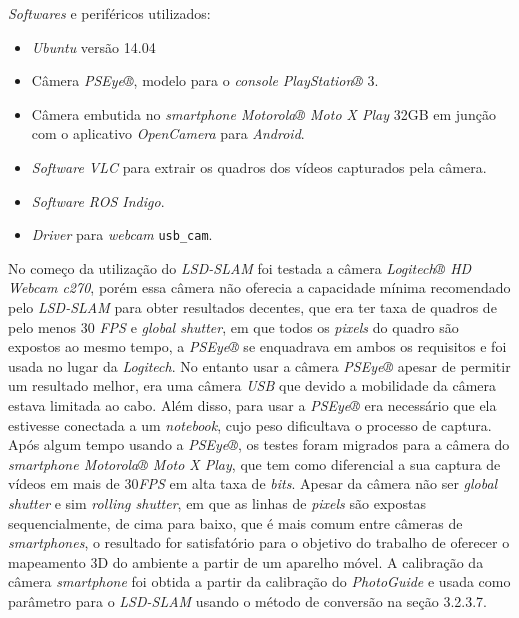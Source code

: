 \textit{Softwares} e periféricos utilizados:

\begin{itemize}
	\item{\textit{Ubuntu} versão 14.04\cite{Ubuntu}}
	\item{Câmera \textit{PSEye®}, modelo para o \textit{console} \textit{PlayStation®} 3.}
	\item{Câmera embutida no \textit{smartphone Motorola® Moto X Play} 32GB em junção com o aplicativo \textit{OpenCamera} para \textit{Android}.}
	\item{\textit{Software VLC} para extrair os quadros dos vídeos capturados pela câmera.}
	\item{\textit{Software ROS Indigo}.\cite{ROS-Tutorial}}
	\item{\textit{Driver} para \textit{webcam} \texttt{usb\_cam}.\cite{Setup-USBCAM}}
\end{itemize}

No começo da utilização do \textit{LSD-SLAM} foi testada a câmera \textit{Logitech® HD Webcam c270}, porém essa câmera não oferecia a capacidade mínima recomendado pelo \textit{LSD-SLAM} para obter resultados decentes, que era ter taxa de quadros de pelo menos 30 \textit{FPS} e \textit{global shutter}, em que todos os \textit{pixels} do quadro são expostos ao mesmo tempo, a \textit{PSEye®} se enquadrava em ambos os requisitos e foi usada no lugar da \textit{Logitech}. No entanto usar a câmera \textit{PSEye®} apesar de permitir um resultado melhor, era uma câmera \textit{USB} que devido a mobilidade da câmera estava limitada ao cabo. Além disso, para usar a \textit{PSEye®} era necessário que ela estivesse conectada a um \textit{notebook}, cujo peso dificultava o processo de captura. Após algum tempo usando a \textit{PSEye®}, os testes foram migrados para a câmera do \textit{smartphone Motorola® Moto X Play}, que tem como diferencial a sua captura de vídeos em mais de 30\textit{FPS} em alta taxa de \textit{bits}. Apesar da câmera não ser \textit{global shutter} e sim \textit{rolling shutter}, em que as linhas de \textit{pixels} são expostas sequencialmente, de cima para baixo, que é mais comum entre câmeras de \textit{smartphones}, o resultado for satisfatório para o objetivo do trabalho de oferecer o mapeamento 3D do ambiente a partir de um aparelho móvel. A calibração da câmera \textit{smartphone} foi obtida a partir da calibração do \textit{PhotoGuide} e usada como parâmetro para o \textit{LSD-SLAM} usando o método de conversão na seção 3.2.3.7.

